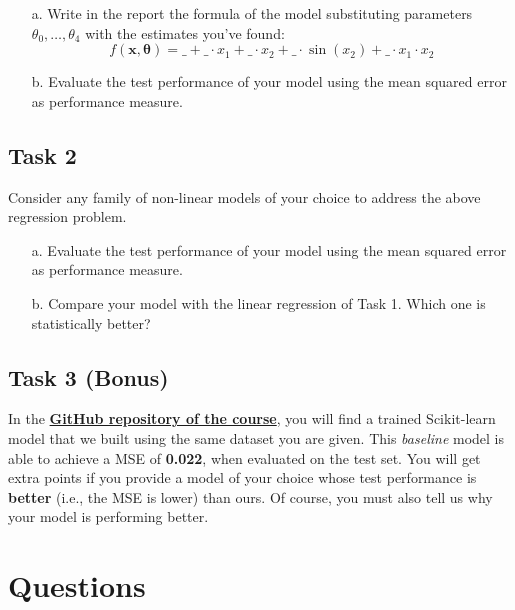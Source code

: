 \documentclass[tikz,14pt,fleqn]{article}
\begin{document}
\begin{itemize}
	\item [a.] Write in the report the formula of the model substituting parameters $\theta_0, \ldots, \theta_4$ with the estimates you've found:
	$$f(\mathbf{x}, \boldsymbol{\theta}) = \_ + \_ \cdot x_1 + \_ \cdot x_2 + \_ \cdot \sin(x_2) + \_ \cdot x_1 \cdot x_2$$
	\item [b.] Evaluate the test performance of your model using the mean squared error as performance measure.
\end{itemize}


\subsection{Task 2}
Consider any family of non-linear models of your choice to address the above regression problem.
\begin{itemize}
	\item [a.] Evaluate the test performance of your model using the mean squared error as performance measure. 
	\item [b.] Compare your model with the linear regression of Task 1. Which one is {statistically} better?
\end{itemize}

\subsection{Task 3 (Bonus)}
In the \href{https://github.com/GiorgiaAuroraAdorni/ML-bachelor-course-assignments-sp23}{\textbf{GitHub repository of the course}}, you will find a trained Scikit-learn model that we built using the same dataset you are given. 
This \textit{baseline} model is able to achieve a MSE of \textbf{0.022}, when evaluated on the test set. 
You will get extra points if you provide a model of your choice whose test performance is \textbf{better} (i.e., the MSE is lower) than ours. Of course, you must also tell us why your model is performing better.

\section{Questions}
\end{document}
